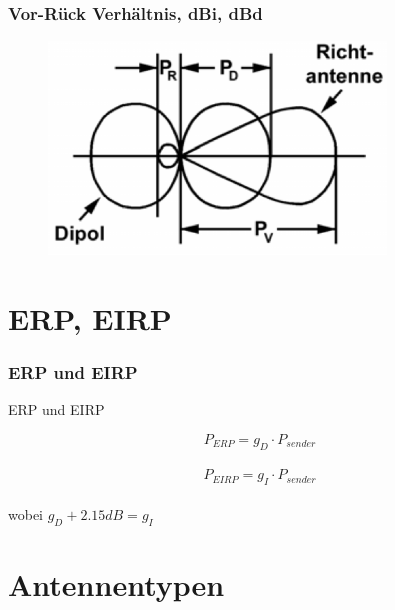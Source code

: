 \begin{frame}
  \frametitle{Vor-Rück Verhältnis, dBi, dBd}
  \begin{center}
    \begin{figure}
      \includegraphics[width=0.8\textwidth,height=.75\textheight,keepaspectratio]{a09/TH206.png}
    \end{figure}
  \end{center}
\end{frame}


\section*{ERP, EIRP}

\begin{frame}
  \frametitle{ERP und EIRP}
  \begin{block}{ERP und EIRP}
    \begin{center}
      \Large $$P_{ERP} = g_{D} \cdot P_{sender}$$ \\
      $$P_{EIRP} = g_{I} \cdot P_{sender}$$ \\
      wobei $g_D + 2.15dB = g_I$
    \end{center}
  \end{block}
\end{frame}

\section*{Antennentypen}

